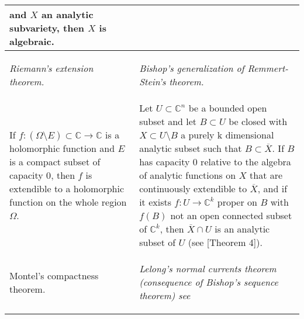 \documentclass[12pt,twoside,a4paper]{report}
\newcommand{\co}{\ensuremath{\mathbb C }}
\newcommand{\con}{\ensuremath{\mathbb{C}^n}}
\begin{document}
\begin{table}[h!]
\begin{tabular}{| m{5cm} | m{5cm} |}
                                and $X$ an analytic subvariety, then $X$ is algebraic.\\
                            \midrule
                            \begin{center}
                                \textit{Riemann's extension theorem.}
                            \end{center}
                                &
                            \begin{center}
                                \textit{Bishop's generalization of Remmert-Stein's theorem.}
                            \end{center} \\
                            \midrule
                                If $f:(\Omega\setminus E)\subset\co\rightarrow\co$ is a holomorphic function and
                                $E$ is a compact subset of capacity $0$, then $f$ is extendible to a holomorphic
                                function on the whole region $\Omega$.
                                         &
                                Let $U\subset\con$ be a bounded open
                                subset and let $B\subset U$ be closed with $X\subset U\setminus B$ a purely k
                                dimensional analytic subset such that $B\subset\overline{X}$. If $B$ has
                                capacity $0$ relative to the algebra of analytic functions on $X$ that are
                                continuously extendible to $\overline{X}$, and if it exists
                                $f:U\rightarrow\co^k$ proper on $B$ with $f(B)$ not an open connected subset of
                                $\co^k$, then $\overline{X}\cap U$ is an analytic subset of $U$
                                (see \cite{Bishop}[Theorem 4]).\\
                            \midrule
                            \begin{center}
                                    Montel's compactness theorem.
                            \end{center}
                                         &
                            \begin{center}
                            \textit{Lelong's normal currents theorem (consequence of Bishop's sequence theorem) see \cite{Lelong}}

\end{center}
\end{tabular}
\end{table}
\end{document}
